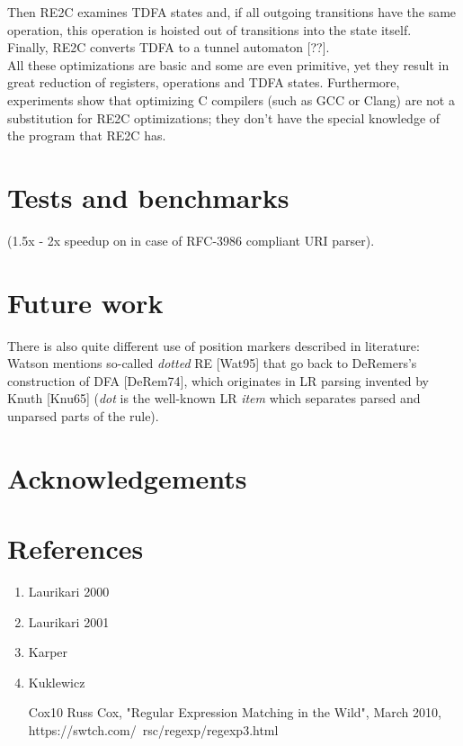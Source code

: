 \documentclass{article}
\theoremstyle{definition}
\begin{document}
\begin{multicols}{2}
Then RE2C examines TDFA states and, if all outgoing transitions have the same operation,
this operation is hoisted out of transitions into the state itself.
\\

Finally, RE2C converts TDFA to a tunnel automaton [??].
\\

All these optimizations are basic and some are even primitive, yet they result in great reduction of registers, operations and TDFA states.
Furthermore, experiments show that optimizing C compilers (such as GCC or Clang) are not a substitution for RE2C optimizations;
they don't have the special knowledge of the program that RE2C has.

\section{Tests and benchmarks}\label{section_tests_and_benchmarks}

(1.5x - 2x speedup on in case of RFC-3986 compliant URI parser).

\section{Future work}\label{section_future_work}

There is also quite different use of position markers described in literature:
Watson mentions so-called \emph{dotted} RE [Wat95]
that go back to DeRemers's construction of DFA [DeRem74],
which originates in LR parsing invented by Knuth [Knu65]
(\emph{dot} is the well-known LR \emph{item} which separates parsed and unparsed parts of the rule).

\section*{Acknowledgements}

\end{multicols}
\pagebreak

\section*{References}

\begin{enumerate}
\item Laurikari 2000
\item Laurikari 2001
\item Karper
\item Kuklewicz

    \item [Cox10] Russ Cox, "Regular Expression Matching in the Wild", March 2010, https://swtch.com/~rsc/regexp/regexp3.html

\end{enumerate}
\end{document}
